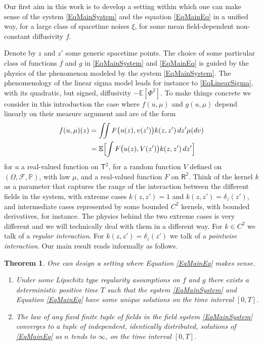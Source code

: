 \documentclass[JEP,XML,SOM,Unicode,published]{cedram}
\newenvironment{enumeratea}
{\bgroup\def\theenumi{\alph{enumi}}\begin{enumerate}}
{\end{enumerate}\egroup}
\newtheorem{thm}{Theorem}
\theoremstyle{definition}
\newcommand\bbE{\mathbb{E}}
\newcommand\bbR{\mathbf{\mathsf{R}}}
\newcommand{\bsfT}{\mathbf{\mathsf{T}}}
\newcommand{\mcF}{\mathcal{F}}
\newcommand{\bbP}{\mathbb{P}}
\begin{document}
Our first aim in this work is to develop a setting within which one can make sense of the system \eqref{EqMainSystem} and the equation \eqref{EqMainEq} in a unified way, for a large class of spacetime noises $\xi$, for some mean field-dependent non-constant diffusivity $f$.

Denote by $z$ and $z'$ some generic spacetime points. The choice of some particular class of functions $f$ and $g$ in \eqref{EqMainSystem} and \eqref{EqMainEq} is guided by the physics of the phenomenon modeled by the system \eqref{EqMainSystem}. The phenomenology of the linear sigma model leads for instance to \eqref{EqLinearSigma}, with its quadratic, but signed, diffusivity $-\bbE[\Phi^2]$. To make things concrete we consider in this introduction the case where $f(u,\mu)$ and $g(u,\mu)$ depend linearly on their measure argument and are of the form\vspace*{-3pt}
\begin{equation} \label{EqModelDiffusivity} \begin{aligned}
f(u,\mu)(z) &= \iint F\bigl(u(z), v(z')\bigr) k(z,z') \, dz' \mu(dv) \\
&= \bbE\Bigl[\int F\bigl(u(z),V(z')\bigr)k(z,z') \, dz'\Bigr]
\end{aligned} \end{equation}
for $u$ a real-valued function on $\bsfT^2$, for a random function $V$ defined on $(\Omega,\mcF,\bbP)$, with law $\mu$, and a real-valued function $F$ on $\bbR^2$. Think of the kernel $k$ as a parameter that captures the range of the interaction between the different fields in the system, with extreme cases $k(z,z')=1$ and $k(z,z')=\delta_z(z')$, and intermediate cases represented by some bounded $C^2$ kernels, with bounded derivatives, for instance. The physics behind the two extreme cases is very different and we will technically deal with them in a different way. For $k\in C^2$ we talk of a \emph{regular interaction}. For $k(z,z')=\delta_z(z')$ we talk of a \emph{pointwise interaction}. Our main result reads informally as follows.

\begin{thm} \label{ThmMainSketch}
One can design a setting where Equation \eqref{EqMainEq} makes sense.
\begin{enumeratea}
\item\label{ThmMainSketcha} Under some Lipschitz type regularity assumptions on $f$ and $g$ there exists a deterministic positive time $T$ such that the system \eqref{EqMainSystem} and Equation \eqref{EqMainEq} have some unique solutions on the time interval $[0,T]$.

\item\label{ThmMainSketchb}
The law of any fixed finite tuple of fields in the field system \eqref{EqMainSystem} converges to a tuple of independent, identically distributed, solutions of \eqref{EqMainEq} as $n$ tends to $\infty$, on the time interval $[0,T]$.
\end{enumeratea}
\end{thm}
\end{document}
